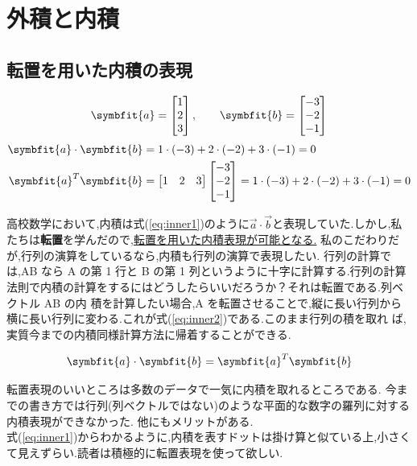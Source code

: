 \section{外積と内積}\label{sec:inner_outer}
\subsection{転置を用いた内積の表現}
\[
\symbfit{a}=\begin{bmatrix}
    1 \\ 2 \\ 3
\end{bmatrix},\qquad \symbfit{b}=\begin{bmatrix}
    -3 \\ -2 \\ -1
\end{bmatrix}
\]
\begin{align}
  \symbfit{a}\cdot \symbfit{b}&=1\cdot(-3)+2\cdot(-2)+3\cdot(-1)=0\label{eq:inner1}\\
  \symbfit{a}^T\symbfit{b}&=\begin{bmatrix}1 & 2 & 3\end{bmatrix}
\begin{bmatrix}-3 \\ -2 \\ -1\end{bmatrix}=1\cdot(-3)+2\cdot(-2)+3\cdot(-1)=0\label{eq:inner2}
\end{align}

高校数学において,内積は式(\ref{eq:inner1})のように$\vec{a}\cdot\vec{b}$と表現していた.しかし,私たちは\textbf{転置}を学んだので,\underline{転置を用いた内積表現が可能となる.}
私のこだわりだが,行列の演算をしているなら,内積も行列の演算で表現したい.
行列の計算では,AB なら A の第 1 行と B の第 1 列というように十字に計算する.行列の計算法則で内積の計算をするにはどうしたらいいだろうか？それは転置である.列ベクトル AB の内
積を計算したい場合,A を転置させることで,縦に長い行列から横に長い行列に変わる.これが式(\ref{eq:inner2})である.このまま行列の積を取れ
ば,実質今までの内積同様計算方法に帰着することができる.
\begin{tcolorbox}[colframe=black!80,colback=white,title=転置表現での内積$_{\text{inner product}}$]
\[
\symbfit{a}\cdot\symbfit{b} = \symbfit{a}^T \symbfit{b}
\]
\end{tcolorbox}
転置表現のいいところは多数のデータで一気に内積を取れるところである.
今までの書き方では行列(列ベクトルではない)のような平面的な数字の羅列に対する内積表現ができなかった.
他にもメリットがある.\\式(\ref{eq:inner1})からわかるように,内積を表すドットは掛け算と似ている上,小さくて見えずらい.読者は積極的に転置表現を使って欲しい.

